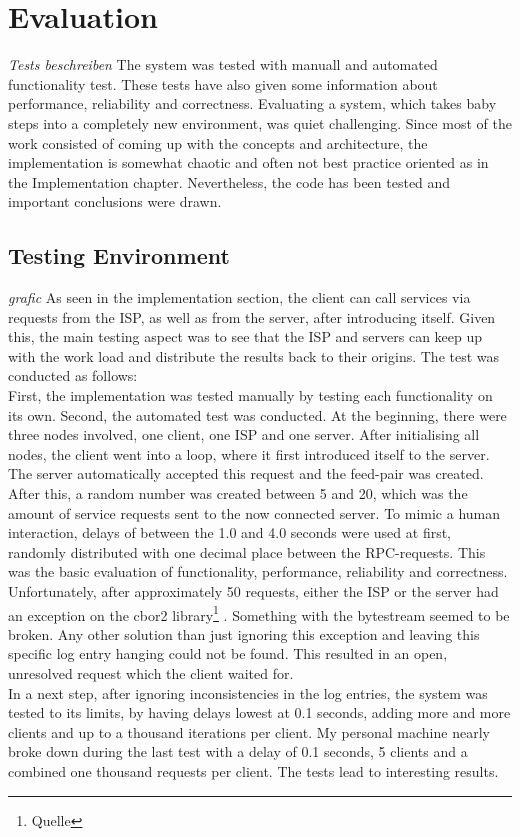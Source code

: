 \chapter{Evaluation}
\textit{Tests beschreiben}
The system was tested with manuall and automated functionality test. These tests have also given some information about performance, reliability and correctness. Evaluating a system, which takes baby steps into a completely new environment, was quiet challenging. Since most of the work consisted of coming up with the concepts and architecture, the implementation is somewhat chaotic and often not best practice oriented as in the Implementation chapter. Nevertheless, the code has been tested and important conclusions were drawn.
\section{Testing Environment}
\textit{grafic}
As seen in the implementation section, the client can call services via requests from the ISP, as well as from the server, after introducing itself. Given this, the main testing aspect was to see that the ISP and servers can keep up with the work load and distribute the results back to their origins. The test was conducted as follows:\\
First, the implementation was tested manually by testing each functionality on its own. Second, the automated test was conducted. At the beginning, there were three nodes involved, one client, one ISP and one server. After initialising all nodes, the client went into a loop, where it first introduced itself to the server. The server automatically accepted this request and the feed-pair was created. After this, a random number was created between 5 and 20, which was the amount of service requests sent to the now connected server. To mimic a human interaction, delays of between the 1.0 and 4.0 seconds were used at first, randomly distributed with one decimal place between the RPC-requests. This was the basic evaluation of functionality, performance, reliability and correctness.\\
Unfortunately, after approximately 50 requests, either the ISP or the server had an exception on the cbor2 library\footnote{Quelle} . Something with the bytestream seemed to be broken. Any other solution than just ignoring this exception and leaving this specific log entry hanging could not be found. This resulted in an open, unresolved request which the client waited for. \\
In a next step, after ignoring inconsistencies in the log entries, the system was tested to its limits, by having delays lowest at 0.1 seconds, adding more and more clients and up to a thousand iterations per client. My personal machine nearly broke down during the last test with a delay of 0.1 seconds, 5 clients and a combined one thousand requests per client. The tests lead to interesting results.

